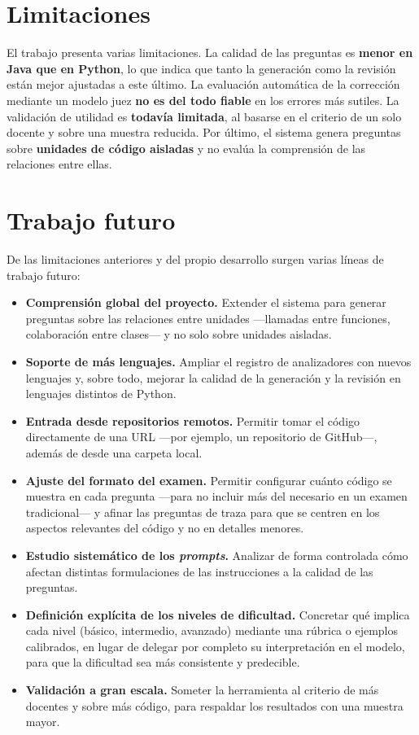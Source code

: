 \section{Limitaciones}
\label{sec:limitaciones}

El trabajo presenta varias limitaciones. La calidad de las preguntas es
\textbf{menor en Java que en Python}, lo que indica que tanto la generación
como la revisión están mejor ajustadas a este último. La evaluación automática
de la corrección mediante un modelo juez \textbf{no es del todo fiable} en los
errores más sutiles. La validación de utilidad es \textbf{todavía limitada}, al basarse en el
criterio de un solo docente y sobre una muestra reducida. Por último, el sistema genera preguntas sobre \textbf{unidades de
código aisladas} y no evalúa la comprensión de las relaciones entre ellas.


\section{Trabajo futuro}
\label{sec:trabajo-futuro}

De las limitaciones anteriores y del propio desarrollo surgen varias líneas de
trabajo futuro:

\begin{itemize}
  \item \textbf{Comprensión global del proyecto.} Extender el sistema para
        generar preguntas sobre las relaciones entre unidades ---llamadas entre
        funciones, colaboración entre clases--- y no solo sobre unidades
        aisladas.
  \item \textbf{Soporte de más lenguajes.} Ampliar el registro de analizadores
        con nuevos lenguajes y, sobre todo, mejorar la calidad de la generación
        y la revisión en lenguajes distintos de Python.
  \item \textbf{Entrada desde repositorios remotos.} Permitir tomar el código
        directamente de una URL ---por ejemplo, un repositorio de GitHub---,
        además de desde una carpeta local.
  \item \textbf{Ajuste del formato del examen.} Permitir configurar cuánto
        código se muestra en cada pregunta ---para no incluir más del necesario
        en un examen tradicional--- y afinar las preguntas de traza para que se
        centren en los aspectos relevantes del código y no en detalles menores.
  \item \textbf{Estudio sistemático de los \emph{prompts}.} Analizar de forma
        controlada cómo afectan distintas formulaciones de las instrucciones a
        la calidad de las preguntas.
  \item \textbf{Definición explícita de los niveles de dificultad.} Concretar
        qué implica cada nivel (básico, intermedio, avanzado) mediante una
        rúbrica o ejemplos calibrados, en lugar de delegar por completo su
        interpretación en el modelo, para que la dificultad sea más consistente
        y predecible.
  \item \textbf{Validación a gran escala.} Someter la herramienta al criterio
        de más docentes y sobre más código, para respaldar los resultados con
        una muestra mayor.
\end{itemize}


